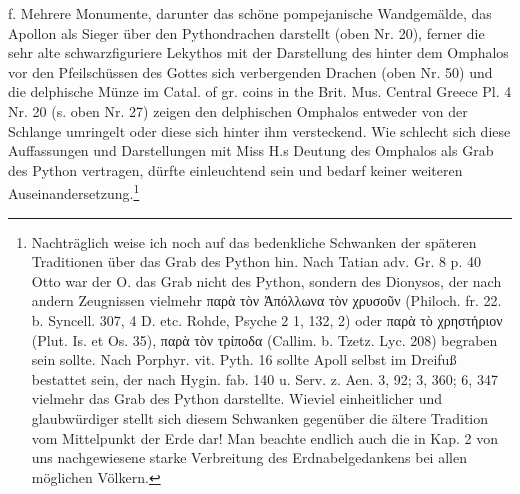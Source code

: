 \documentclass[a4paper, 11pt, oneside]{article}
\begin{document}
f. Mehrere Monumente, darunter das schöne pompejanische Wandgemälde, das Apollon als Sieger über den Pythondrachen darstellt (oben Nr. 20), ferner die sehr alte schwarzfiguriere Lekythos mit der Darstellung des hinter dem Omphalos vor den Pfeilschüssen des Gottes sich verbergenden Drachen (oben Nr. 50) und die delphische Münze im Catal. of gr. coins in the Brit. Mus. Central Greece Pl. 4 Nr. 20 (s. oben Nr. 27) zeigen den delphischen Omphalos entweder von der Schlange umringelt oder diese sich hinter ihm versteckend. Wie schlecht sich diese Auffassungen und Darstellungen mit Miss H.s Deutung des Omphalos als Grab des Python vertragen, dürfte einleuchtend sein und bedarf keiner weiteren Auseinandersetzung.\footnote{Nachträglich weise ich noch auf das bedenkliche Schwanken der späteren Traditionen über das Grab des Python hin. Nach Tatian adv. Gr. 8 p. 40 Otto war der O. das Grab nicht des Python, sondern des Dionysos, der nach andern Zeugnissen vielmehr παρὰ τὸν Ἀπόλλωνα τὸν χρυσοῦν (Philoch. fr. 22. b. Syncell. 307, 4 D. etc. Rohde, Psyche 2 1, 132, 2) oder παρὰ τὸ χρηστήριον (Plut. Is. et Os. 35), παρὰ τὸν τρίποδα (Callim. b. Tzetz. Lyc. 208) begraben sein sollte. Nach Porphyr. vit. Pyth. 16 sollte Apoll selbst im Dreifuß bestattet sein, der nach Hygin. fab. 140 u. Serv. z. Aen. 3, 92; 3, 360; 6, 347 vielmehr das Grab des Python darstellte. Wieviel einheitlicher und glaubwürdiger stellt sich diesem Schwanken gegenüber die ältere Tradition vom Mittelpunkt der Erde dar! Man beachte endlich auch die in Kap. 2 von uns nachgewiesene starke Verbreitung des Erdnabelgedankens bei allen möglichen Völkern.}
\end{document}
